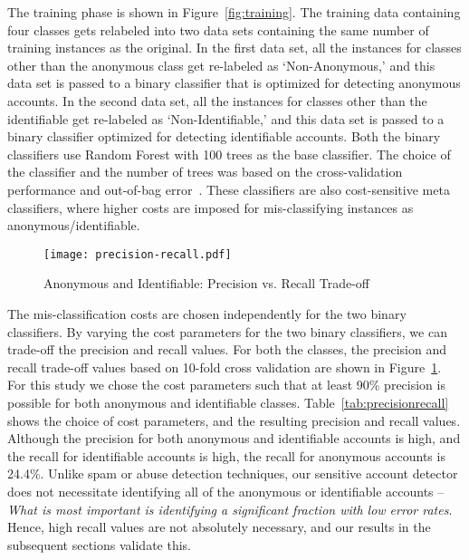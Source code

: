 \documentclass[conference]{IEEEtran}
\begin{document}
The training phase is shown in Figure~\ref{fig:training}. The training data containing four classes gets relabeled into two data sets containing the same number of training instances as the original. In the first data set, all the instances for classes other than the anonymous class get re-labeled as `Non-Anonymous,' and this data set is passed to a binary classifier that is optimized for detecting anonymous accounts. In the second data set, all the instances for classes other than the identifiable get re-labeled as `Non-Identifiable,' and this data set is passed to a binary classifier optimized for detecting identifiable accounts. 
Both the binary classifiers use Random Forest with 100 trees as the base classifier. The choice of the classifier and the number of trees was based on the cross-validation performance and out-of-bag error~\cite{introductiontostatisticallearning}. These classifiers are also cost-sensitive meta classifiers, where higher costs are imposed for mis-classifying instances as anonymous/identifiable. 

\begin{figure}[thbp]
\begin{center}
  \centering
    \caption{Anonymous and Identifiable: Precision vs. Recall Trade-off}
  \label{fig:precisionrecall}
     \texttt{[image: precision-recall.pdf]}
\end{center}
\end{figure}

The mis-classification costs are chosen independently for the two binary classifiers.
By varying the cost parameters for the two binary classifiers, we can trade-off the precision and recall values. 
For both the classes, the precision and recall trade-off values based on 10-fold cross validation are shown in Figure~\ref{fig:precisionrecall}. 
For this study we chose the cost parameters such that at least 90\% precision is possible for both anonymous and identifiable classes. Table~\ref{tab:precisionrecall} shows the choice of cost parameters, and the resulting precision and recall values. 
Although the precision for both anonymous and identifiable accounts is high, and the recall for identifiable accounts is high, the recall for anonymous accounts is 24.4\%.
Unlike spam or abuse detection techniques, our sensitive account detector does not necessitate identifying all of the anonymous or identifiable accounts -- {\em What is most important is identifying a significant fraction with low error rates}. Hence, high recall values are not absolutely necessary, and our results in the subsequent sections validate this. 
\end{document}
